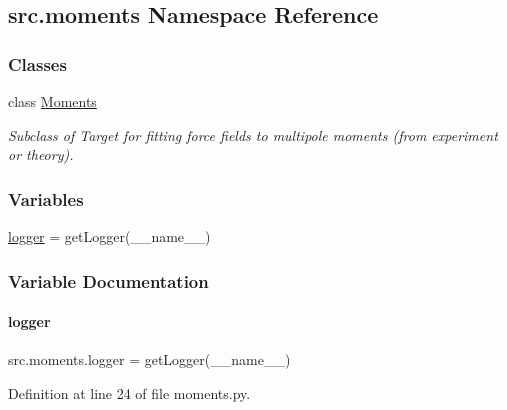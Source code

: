 \hypertarget{namespacesrc_1_1moments}{}\subsection{src.\+moments Namespace Reference}
\label{namespacesrc_1_1moments}
\subsubsection*{Classes}
\begin{DoxyCompactItemize}
\item 
class \hyperlink{classsrc_1_1moments_1_1Moments}{Moments}
\begin{DoxyCompactList}\small\item\em Subclass of Target for fitting force fields to multipole moments (from experiment or theory). \end{DoxyCompactList}\end{DoxyCompactItemize}
\subsubsection*{Variables}
\begin{DoxyCompactItemize}
\item 
\hyperlink{namespacesrc_1_1moments_a6f4d08324827d0232bb4b8d82a6e09aa}{logger} = get\+Logger(\+\_\+\+\_\+name\+\_\+\+\_\+)
\end{DoxyCompactItemize}


\subsubsection{Variable Documentation}
\mbox{\label{namespacesrc_1_1moments_a6f4d08324827d0232bb4b8d82a6e09aa}} 
\paragraph{\texorpdfstring{logger}{logger}}
{\footnotesize\ttfamily src.\+moments.\+logger = get\+Logger(\+\_\+\+\_\+name\+\_\+\+\_\+)}



Definition at line 24 of file moments.\+py.

